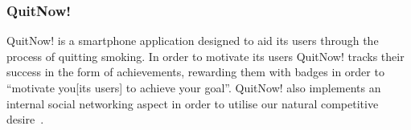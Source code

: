 \documentclass[a4paper,12pt]{article}
\begin{document}
\begin{figure}[!ht]
\begin{minipage}{.5\textwidth}
  \label{application-runkeeper-social}
\end{minipage}
\end{figure}


\subsubsection{QuitNow!}
QuitNow! is a smartphone application designed to aid its users through the process of quitting smoking.
In order to motivate its users QuitNow! tracks their success in the form of achievements, rewarding them with badges in order to ``motivate you[its users] to achieve your goal''\citep{quitnow}. 
QuitNow! also implements an internal social networking aspect in order to utilise our natural competitive desire~\citep{bread-and-games}.\\
\end{document}
